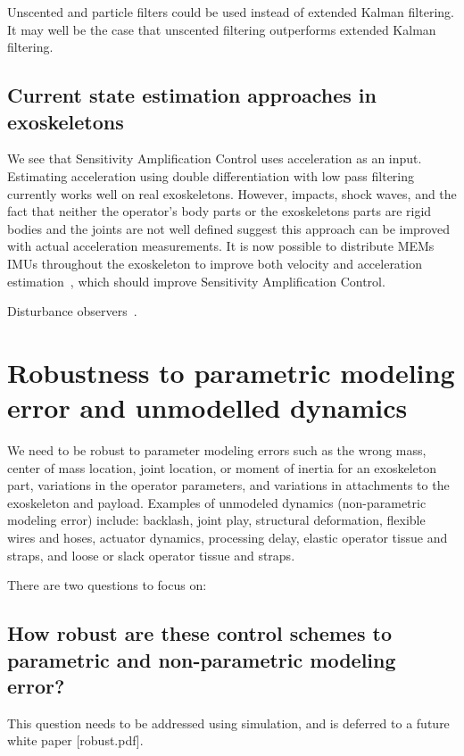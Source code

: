 \documentclass[letterpaper,12pt,fullpage]{article}
\begin{document}
Unscented and particle filters could be used instead of extended
Kalman filtering. It may well be the case that unscented filtering
outperforms extended Kalman filtering.

\subsection{Current state estimation approaches in exoskeletons}

We see that Sensitivity Amplification Control uses acceleration as an input.
Estimating acceleration using double differentiation with low pass filtering
currently works well on real exoskeletons.
However, impacts, shock waves, and the fact that neither
the operator's body parts or the exoskeletons parts are rigid bodies and the
joints are not well defined suggest this approach can be improved with actual
acceleration measurements.
It is now possible to distribute MEMs IMUs throughout the exoskeleton to
improve both velocity and 
acceleration estimation~\cite{Xinjilefu-thesis}, which should improve
Sensitivity Amplification Control.

Disturbance observers~\cite{IEEE06197032}.

\section{Robustness to parametric modeling error and unmodelled dynamics}

We need to be robust to parameter modeling errors such as the wrong mass,
center of mass location, joint location,
or moment of inertia for an exoskeleton part, variations in the operator
parameters, and variations in attachments to the exoskeleton and payload.
Examples of unmodeled dynamics (non-parametric modeling error) include:
backlash, joint play, structural deformation, flexible wires and hoses,
actuator dynamics, processing delay,
elastic operator tissue and straps, and 
loose or slack operator tissue and straps.

There are two questions to focus on:

\subsection{How robust are these control schemes to parametric and non-parametric
modeling error?}

This question needs to be addressed using simulation, and is deferred to a future
white paper [robust.pdf].
\end{document}
